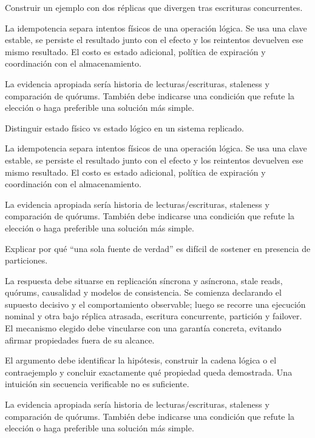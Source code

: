 \documentclass[variant=guia,cover=institutional,mode=screen]{ua-engineering-v6-article}
\begin{document}
\begin{uaexercise}
Construir un ejemplo con dos réplicas que divergen tras escrituras concurrentes.
\end{uaexercise}
\begin{uaanswer}
La idempotencia separa intentos físicos de una operación lógica. Se usa una clave estable, se persiste el resultado junto con el efecto y los reintentos devuelven ese mismo resultado. El costo es estado adicional, política de expiración y coordinación con el almacenamiento.

La evidencia apropiada sería historia de lecturas/escrituras, staleness y comparación de quórums. También debe indicarse una condición que refute la elección o haga preferible una solución más simple.
\end{uaanswer}

\begin{uaexercise}
Distinguir estado físico vs estado lógico en un sistema replicado.
\end{uaexercise}
\begin{uaanswer}
La idempotencia separa intentos físicos de una operación lógica. Se usa una clave estable, se persiste el resultado junto con el efecto y los reintentos devuelven ese mismo resultado. El costo es estado adicional, política de expiración y coordinación con el almacenamiento.

La evidencia apropiada sería historia de lecturas/escrituras, staleness y comparación de quórums. También debe indicarse una condición que refute la elección o haga preferible una solución más simple.
\end{uaanswer}

\begin{uaexercise}
Explicar por qué “una sola fuente de verdad” es difícil de sostener en presencia de particiones.
\end{uaexercise}
\begin{uaanswer}
La respuesta debe situarse en replicación síncrona y asíncrona, stale reads, quórums, causalidad y modelos de consistencia. Se comienza declarando el supuesto decisivo y el comportamiento observable; luego se recorre una ejecución nominal y otra bajo réplica atrasada, escritura concurrente, partición y failover. El mecanismo elegido debe vincularse con una garantía concreta, evitando afirmar propiedades fuera de su alcance.

El argumento debe identificar la hipótesis, construir la cadena lógica o el contraejemplo y concluir exactamente qué propiedad queda demostrada. Una intuición sin secuencia verificable no es suficiente.

La evidencia apropiada sería historia de lecturas/escrituras, staleness y comparación de quórums. También debe indicarse una condición que refute la elección o haga preferible una solución más simple.
\end{uaanswer}
\end{document}
